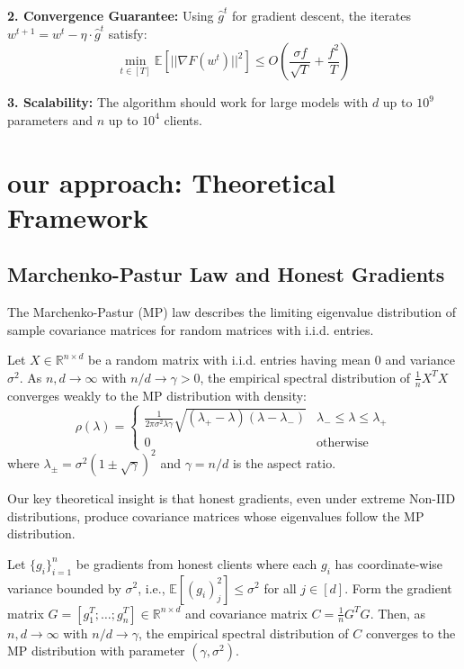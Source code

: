 \documentclass[runningheads]{llncs}
\begin{document}
\textbf{2. Convergence Guarantee:} Using $\hat{g}^t$ for gradient descent, the iterates $w^{t+1} = w^t - \eta \cdot \hat{g}^t$ satisfy:
\begin{equation}
\min_{t \in [T]} \mathbb{E}[||\nabla F(w^t)||^2] \leq O\left(\frac{\sigma f}{\sqrt{T}} + \frac{f^2}{T}\right)
\end{equation}

\textbf{3. Scalability:} The algorithm should work for large models with $d$ up to $10^9$ parameters and $n$ up to $10^4$ clients.

\section{our approach: Theoretical Framework}

\subsection{Marchenko-Pastur Law and Honest Gradients}

The Marchenko-Pastur (MP) law describes the limiting eigenvalue distribution of sample covariance matrices for random matrices with i.i.d. entries.

\begin{definition}
Let $X \in \mathbb{R}^{n \times d}$ be a random matrix with i.i.d. entries having mean $0$ and variance $\sigma^2$. As $n, d \to \infty$ with $n/d \to \gamma > 0$, the empirical spectral distribution of $\frac{1}{n}X^T X$ converges weakly to the MP distribution with density:
\begin{equation}
\rho(\lambda) = \begin{cases}
\frac{1}{2\pi\sigma^2\lambda\gamma}\sqrt{(\lambda_+ - \lambda)(\lambda - \lambda_-)} & \lambda_- \leq \lambda \leq \lambda_+ \\
0 & \text{otherwise}
\end{cases}
\end{equation}
where $\lambda_{\pm} = \sigma^2(1 \pm \sqrt{\gamma})^2$ and $\gamma = n/d$ is the aspect ratio.
\end{definition}

Our key theoretical insight is that honest gradients, even under extreme Non-IID distributions, produce covariance matrices whose eigenvalues follow the MP distribution.

\begin{theorem}
Let $\{g_i\}_{i=1}^n$ be gradients from honest clients where each $g_i$ has coordinate-wise variance bounded by $\sigma^2$, i.e., $\mathbb{E}[(g_i)_j^2] \leq \sigma^2$ for all $j \in [d]$. Form the gradient matrix $G = [g_1^T; \ldots; g_n^T] \in \mathbb{R}^{n \times d}$ and covariance matrix $C = \frac{1}{n}G^T G$. Then, as $n, d \to \infty$ with $n/d \to \gamma$, the empirical spectral distribution of $C$ converges to the MP distribution with parameter $(\gamma, \sigma^2)$.
\end{theorem}
\end{document}
